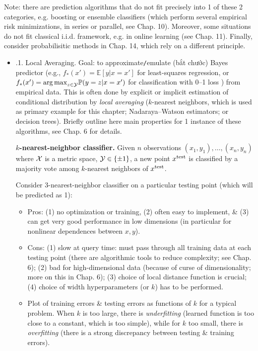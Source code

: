 \documentclass{article}
\begin{document}
\begin{enumerate}
\begin{itemize}
\begin{itemize}
			Note: there are prediction algorithms that do not fit precisely into 1 of these 2 categories, e.g. boosting or ensemble classifiers (which perform several empirical risk minimizations, in series or parallel, see Chap. 10). Moreover, some situations do not fit classical i.i.d. framework, e.g. in online learning (see Chap. 11). Finally, consider probabilisitic methods in Chap. 14, which rely on a different principle.
			\begin{itemize}
				\item {.1. Local Averaging.} Goal: to approximate{\tt/}emulate (bắt chước) Bayes predictor (e.g., $f_*(x') = \mathbb{E}[y|x = x']$ for least-squares regression, or $f_*(x') = {\arg\max}_{z\in{\cal Y}} \mathbb{P}(y = z|x = x')$ for classification with 0--1 loss )  from empirical data. This is often done by explicit or implicit estimation of conditional distribution by {\it local averaging} ($k$-nearest neighbors, which is used as primary example for this chapter; Nadaraya--Watson estimators; or decision trees). Briefly outline here main properties for 1 instance of these algorithms, see Chap. 6 for details.
				
				{\bf$k$-nearest-neighbor classifier.} Given $n$ observations $(x_1,y_1),\ldots,(x_n,y_n)$ where ${\cal X}$ is a metric space, ${\cal Y}\in\{\pm1\}$, a new point $x^{\rm test}$ is classified by a majority vote among $k$-nearest neighbors of $x^{\rm test}$.
				
				Consider 3-nearest-neighbor classifier on a particular testing point (which will be predicted as 1):
				\begin{itemize}
					\item Pros: (1) no optimization or training, (2) often easy to implement, \& (3) can get very good performance in low dimensions (in particular for nonlinear dependences between $x,y$).
					\item Cons: (1) slow at query time: must pass through all training data at each testing point (there are algorithmic tools to reduce complexity; see Chap. 6); (2) bad for high-dimensional data (because of curse of dimensionality; more on this in Chap. 6); (3) choice of local distance function is crucial; (4) choice of width hyperparameters (or $k$) has to be performed.
					\item Plot of training errors \& testing errors as functions of $k$ for a typical problem. When $k$ is too large, there is {\it underfitting} (learned function is too close to a constant, which is too simple), while for $k$ too small, there is {\it overfitting} (there is a strong discrepancy between testing \& training errors).
				\end{itemize}
				

\end{itemize}
\end{itemize}
\end{itemize}
\end{enumerate}
\end{document}
